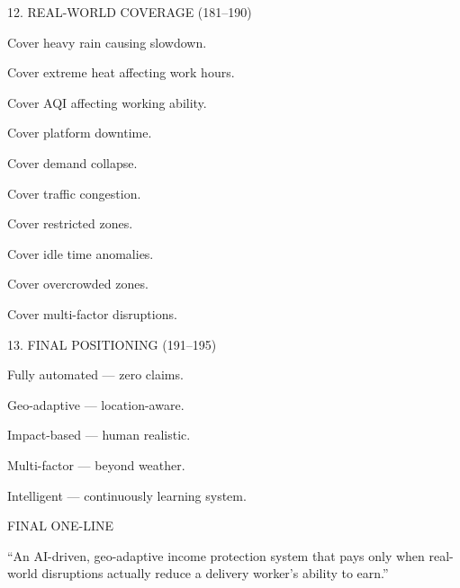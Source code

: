 12. REAL-WORLD COVERAGE (181–190) 

Cover heavy rain causing slowdown. 

Cover extreme heat affecting work hours. 

Cover AQI affecting working ability. 

Cover platform downtime. 

Cover demand collapse. 

Cover traffic congestion. 

Cover restricted zones. 

Cover idle time anomalies. 

Cover overcrowded zones. 

Cover multi-factor disruptions. 

 

13. FINAL POSITIONING (191–195) 

Fully automated — zero claims. 

Geo-adaptive — location-aware. 

Impact-based — human realistic. 

Multi-factor — beyond weather. 

Intelligent — continuously learning system. 

 

FINAL ONE-LINE 

“An AI-driven, geo-adaptive income protection system that pays only when real-world disruptions actually reduce a delivery worker’s ability to earn.” 

 

 